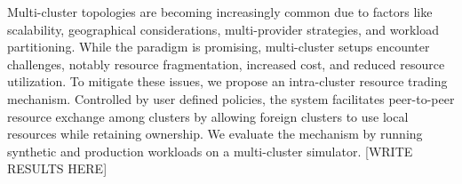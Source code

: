 



Multi-cluster topologies are becoming increasingly common due to factors like
scalability, geographical considerations, multi-provider strategies, and
workload partitioning. While the paradigm is promising, multi-cluster setups
encounter challenges, notably resource fragmentation, increased cost, and
reduced resource utilization. To mitigate these issues, we propose an
intra-cluster resource trading mechanism. Controlled by user defined policies,
the system facilitates peer-to-peer resource exchange among clusters by
allowing foreign clusters to use local resources while retaining ownership. We
evaluate the mechanism by running synthetic and production workloads on a
multi-cluster simulator. [WRITE RESULTS HERE]
